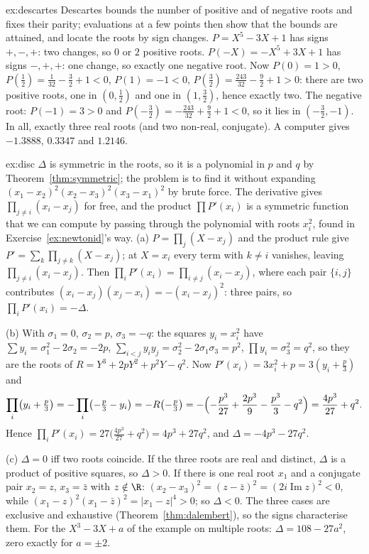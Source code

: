 \begin{solution}{ex:descartes}
\idea Descartes bounds the number of positive and of negative roots and fixes their parity; evaluations at a few points then show that the bounds are attained, and locate the roots by sign changes.
\writeup $P=X^5-3X+1$ has signs $+,-,+$: two changes, so $0$ or $2$ positive roots. $P(-X)=-X^5+3X+1$ has signs $-,+,+$: one change, so exactly one negative root. Now $P(0)=1>0$, $P(\frac12)=\frac1{32}-\frac32+1<0$, $P(1)=-1<0$, $P(\frac32)=\frac{243}{32}-\frac92+1>0$: there are two positive roots, one in $(0,\frac12)$ and one in $(1,\frac32)$, hence exactly two. The negative root: $P(-1)=3>0$ and $P(-\frac32)=-\frac{243}{32}+\frac92+1<0$, so it lies in $(-\frac32,-1)$. In all, exactly three real roots (and two non-real, conjugate). A computer gives $-1.3888$, $0.3347$ and $1.2146$.
\end{solution}

\begin{solution}{ex:disc}
\idea $\Delta$ is symmetric in the roots, so it is a polynomial in $p$ and $q$ by Theorem~\ref{thm:symmetric}; the problem is to find it without expanding $(x_1-x_2)^2(x_2-x_3)^2(x_3-x_1)^2$ by brute force. The derivative gives $\prod_{j\ne i}(x_i-x_j)$ for free, and the product $\prod P'(x_i)$ is a symmetric function that we can compute by passing through the polynomial with roots $x_i^2$, found in Exercise~\ref{ex:newtonid}'s way.
\writeup (a) $P=\prod_j(X-x_j)$ and the product rule give $P'=\sum_k\prod_{j\ne k}(X-x_j)$; at $X=x_i$ every term with $k\ne i$ vanishes, leaving $\prod_{j\ne i}(x_i-x_j)$. Then $\prod_iP'(x_i)=\prod_{i\ne j}(x_i-x_j)$, where each pair $\{i,j\}$ contributes $(x_i-x_j)(x_j-x_i)=-(x_i-x_j)^2$: three pairs, so $\prod_iP'(x_i)=-\Delta$.

(b) With $\sigma_1=0$, $\sigma_2=p$, $\sigma_3=-q$: the squares $y_i=x_i^2$ have $\sum y_i=\sigma_1^2-2\sigma_2=-2p$, $\sum_{i<j}y_iy_j=\sigma_2^2-2\sigma_1\sigma_3=p^2$, $\prod y_i=\sigma_3^2=q^2$, so they are the roots of $R=Y^3+2pY^2+p^2Y-q^2$. Now $P'(x_i)=3x_i^2+p=3(y_i+\frac p3)$ and
\[
\prod_i\bigl(y_i+\tfrac p3\bigr)=-\prod_i\bigl(-\tfrac p3-y_i\bigr)=-R\bigl(-\tfrac p3\bigr)=-\Bigl(-\frac{p^3}{27}+\frac{2p^3}9-\frac{p^3}3-q^2\Bigr)=\frac{4p^3}{27}+q^2.
\]
Hence $\prod_iP'(x_i)=27\bigl(\frac{4p^3}{27}+q^2\bigr)=4p^3+27q^2$, and $\Delta=-4p^3-27q^2$.

(c) $\Delta=0$ iff two roots coincide. If the three roots are real and distinct, $\Delta$ is a product of positive squares, so $\Delta>0$. If there is one real root $x_1$ and a conjugate pair $x_2=z$, $x_3=\bar z$ with $z\notin\R$: $(x_2-x_3)^2=(z-\bar z)^2=(2i\operatorname{Im}z)^2<0$, while $(x_1-z)^2(x_1-\bar z)^2=|x_1-z|^4>0$; so $\Delta<0$. The three cases are exclusive and exhaustive (Theorem~\ref{thm:dalembert}), so the signs characterise them. For the $X^3-3X+a$ of the example on multiple roots: $\Delta=108-27a^2$, zero exactly for $a=\pm2$.
\end{solution}

